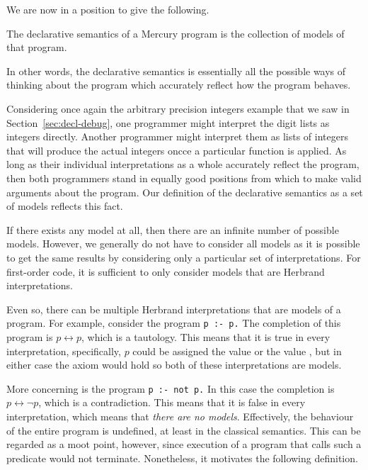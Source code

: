 We are now in a position to give the following.

\begin{definition}
\label{def:declarative-semantics}
The declarative semantics of a Mercury program
is the collection of models of that program.
\end{definition}

\noindent
In other words,
the declarative semantics is essentially
all the possible ways of thinking about the program
which accurately reflect how the program behaves.

Considering once again
the arbitrary precision integers example
that we saw in Section~\ref{sec:decl-debug},
one programmer might interpret the digit lists as integers directly.
Another programmer might interpret them as
lists of integers that will produce
the actual integers oncce a particular function is applied.
As long as their individual interpretations as a whole
accurately reflect the program,
then both programmers stand in equally good positions
from which to make valid arguments about the program.
Our definition of the declarative semantics as a set of models
reflects this fact.

If there exists any model at all,
then there are an infinite number of possible models.
However, we generally do not have to consider all models
as it is possible to get the same results
by considering only a particular set of interpretations.
For first-order code,
it is sufficient to only consider models
that are Herbrand interpretations.

Even so, there can be multiple Herbrand interpretations
that are models of a program.
For example, consider the program \texttt{p :- p.}
The completion of this program is $p \leftrightarrow p$,
which is a tautology.
This means that it is true in every interpretation,
specifically,
$p$ could be assigned the value  or the value ,
but in either case the axiom would hold
so both of these interpretations are models.

More concerning is the program \texttt{p :- not p.}
In this case the completion is $p \leftrightarrow \lnot p$,
which is a contradiction.
This means that it is false in every interpretation,
which means that \emph{there are no models}.
Effectively, the behaviour of the entire program is undefined,
at least in the classical semantics.
This can be regarded as a moot point, however,
since execution of a program that calls such a predicate would not terminate.
Nonetheless, it motivates the following definition.

